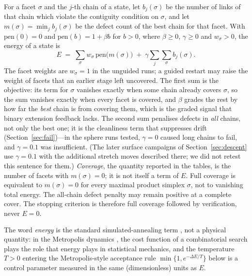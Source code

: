 \documentclass[12pt]{article}
\begin{document}
For a facet $\sigma$ and the $j$-th chain of a state, let $b_j(\sigma)$
be the number of links of that chain which violate the contiguity
condition on $\sigma$, and let $m(\sigma)=\min_j b_j(\sigma)$ be the
defect count of the best chain for that facet.  With $\mathrm{pen}(0)=0$
and $\mathrm{pen}(b)=1+\beta b$ for $b>0$, where $\beta\ge0$,
$\gamma\ge0$ and $w_\sigma>0$, the energy of a state is
\[
E \;=\; \sum_{\sigma} w_\sigma\,\mathrm{pen}\bigl(m(\sigma)\bigr)
\;+\; \gamma\sum_{j}\sum_{\sigma} b_j(\sigma).
\]
The facet weights are $w_\sigma=1$ in the unguided runs; a guided
restart may raise the weight of facets that an earlier stage left
uncovered.  The first sum is the objective: its term for $\sigma$
vanishes exactly when some chain already covers $\sigma$, so the sum
vanishes exactly when every facet is covered, and $\beta$ grades the rest by how
far the \emph{best} chain is from covering them, which is the graded
signal that binary extension feedback lacks.  The second sum penalises defects in \emph{all}
chains, not only the best one; it is the cleanliness term that
suppresses drift (Section~\ref{sec:fail})---in the sphere runs
tested, $\gamma=0$ caused long chains to fail, and $\gamma=0.1$ was
insufficient.  (The later surface campaigns of Section~\ref{sec:descent}
use $\gamma=0.1$ with the additional stretch moves described there; we
did not retest this sentence for them.)  \emph{Coverage}, the quantity
reported in the tables, is the number of facets with $m(\sigma)=0$; it
is not itself a term of $E$.
Full coverage is equivalent to $m(\sigma)=0$ for every maximal
product simplex $\sigma$, not to vanishing total energy. The
all-chain defect penalty may remain positive at a complete cover.
The stopping criterion is therefore full coverage followed by
verification, never $E=0$.

The word \emph{energy} is the standard simulated-annealing term
\cite{KGV83,Cerny85}, not a physical quantity: in the Metropolis
dynamics \cite{Metropolis53}, the cost function of a combinatorial
search plays the role that energy plays in statistical mechanics, and
the temperature $T>0$ entering the Metropolis-style acceptance rule
$\min\{1,e^{-\Delta E/T}\}$ below is a control parameter measured in the same (dimensionless)
units as $E$.
\end{document}
